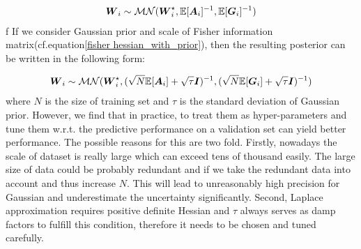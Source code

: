 \begin{equation}
\begin{aligned} \label{mvg}
\boldsymbol W_{i} \sim \mathcal{MN}(\boldsymbol W_i^\star, \mathbb E[\boldsymbol A_i]^{-1}, \mathbb E[\boldsymbol G_i]^{-1})
\end{aligned}
\end{equation}
f
If we consider Gaussian prior and scale of Fisher information matrix(cf.equation\ref{fisher hessian_with_prior}), then the resulting posterior can be written in the following form:

\begin{equation}
\begin{aligned} \label{mvg_prior}
\boldsymbol W_{i} \sim \mathcal{MN}(\boldsymbol W_i^\star, (\sqrt{N} \mathbb E[\boldsymbol A_i]+\sqrt{\tau}\boldsymbol I)^{-1}, (\sqrt{N}\mathbb E[\boldsymbol G_i]+\sqrt{\tau}\boldsymbol I)^{-1})
\end{aligned}
\end{equation} 
where $N$ is the size of training set and $\tau$ is the standard deviation of Gaussian prior.
However, we find that in practice, to treat them as hyper-parameters and tune them w.r.t. the predictive performance on a validation set can yield better performance. The possible reasons for this are two fold. Firstly, nowadays the scale of dataset is really large which can exceed tens of thousand easily. The large size of data could be probably redundant and if we take the redundant data into account and thus increase $N$. This will lead to unreasonably high precision for Gaussian and underestimate the uncertainty significantly. Second, Laplace approximation requires positive definite Hessian and $\tau$ always serves as damp factors to fulfill this condition, therefore it needs to be chosen and tuned carefully.    




